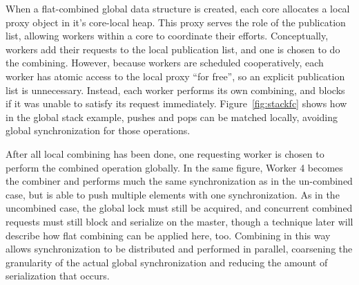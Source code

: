 

When a flat-combined global data structure is created, each core allocates a local proxy object in it's core-local heap. This proxy serves the role of the publication list, allowing workers within a core to coordinate their efforts. 
Conceptually, workers add their requests to the local publication list, and one is chosen to do the combining. However, because workers are scheduled cooperatively, each worker has atomic access to the local proxy ``for free'', so an explicit publication list is unnecessary.
Instead, each worker performs its own combining, and blocks if it was unable to satisfy its request immediately. Figure~\ref{fig:stackfc} shows how in the global stack example, pushes and pops can be matched locally, avoiding global synchronization for those operations.

After all local combining has been done, one requesting worker is chosen to perform the combined operation globally. In the same figure, Worker 4 becomes the combiner and performs much the same synchronization as in the un-combined case, but is able to push multiple elements with one synchronization. As in the uncombined case, the global lock must still be acquired, and concurrent combined requests must still block and serialize on the master, though a technique later will describe how flat combining can be applied here, too. Combining in this way allows synchronization to be distributed and performed in parallel, coarsening the granularity of the actual global synchronization and reducing the amount of serialization that occurs.


